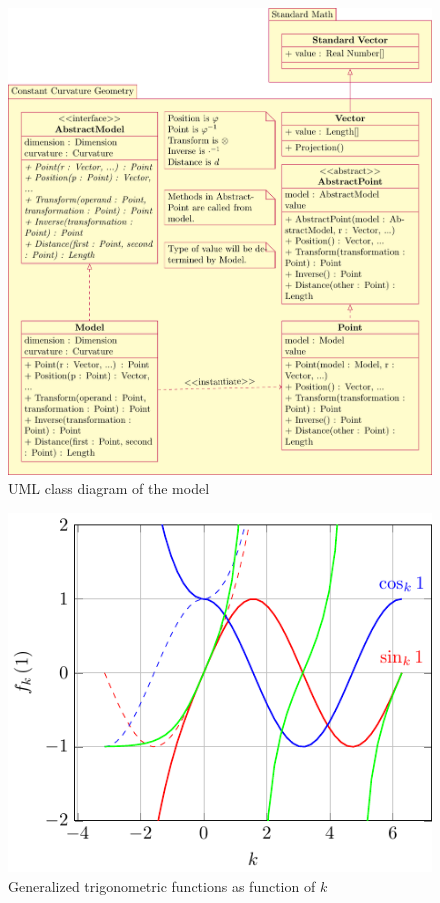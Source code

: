 \documentclass[stu, babel, american, biblatex, a4paper, draftall]{apa7}
\begin{document}
\section*{}
\begin{figure}
    \centering
    \includegraphics[width=\textwidth]{algorithm/modelclass.pdf}
    \caption{UML class diagram of the model}\label{ModelClassDiagram}
\end{figure}
\begin{figure}
    \centering
    \includegraphics[width=\textwidth]{trigonometric/2dplot.pdf}
    \caption{Generalized trigonometric functions as function of $k$}\label{TrigonometryPlotted}
\end{figure}
\end{document}

